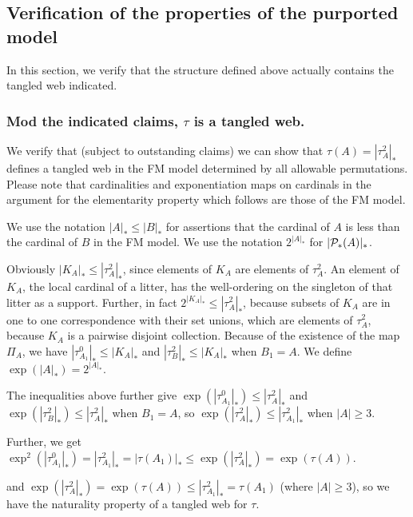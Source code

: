 \documentclass[12pt]{article}
\begin{document}
\newpage

\subsection{Verification of the properties of the purported model}

In this section, we verify that the structure defined above actually contains the tangled web indicated.

\newpage

\subsubsection{Mod the indicated claims, $\tau$ is a tangled web.}

We verify that (subject to outstanding claims) we can show that $\tau(A) = |\tau^2_A|_*$ defines a tangled web in the FM model determined by all allowable permutations.  Please note that cardinalities and exponentiation maps on cardinals in the argument for the elementarity property which  follows are those of the FM model.

We use the notation $|A|_* \leq |B|_*$ for assertions that the cardinal of $A$ is less than the cardinal of $B$ in the FM model.  We use the notation $2^{|A|_*}$ for $|{\cal P}_*(A)|_*$.

Obviously $|K_A|_* \leq |\tau^2_A|_*$, since elements of $K_A$ are elements of $\tau^2_A$.  An element of $K_A$, the local cardinal of a litter, has the well-ordering on the singleton of that litter
as a support.  Further, in fact $2^{|K_A|_*} \leq |\tau^2_A|_*$, because subsets of $K_A$ are in one to one correspondence with their set unions, which are elements of
$\tau^2_A$, because $K_A$ is a pairwise disjoint collection.  Because of the existence of the map $\Pi_A$, we have $|\tau^0_{A_1}|_* \leq |K_A|_*$ and
$|\tau^2_B|_* \leq |K_A|_*$ when $B_1=A$.  We define $\exp(|A|_*) = 2^{|A|_*}$.

The inequalities above further give $\exp(|\tau^0_{A_1}|_*) \leq |\tau^2_A|_*$ and $\exp(|\tau^2_B|_*) \leq |\tau^2_A|_*$ when $B_1=A$, so $\exp(|\tau^2_{A}|_*) \leq |\tau^2_{A_1}|_*$ when $|A|\geq 3$.

Further, we get $\exp^2(|\tau^0_{A_1}|_*) = |\tau^2_{A_1}|_* = |\tau(A_1)|_* \leq \exp(|\tau^2_A|_*) = \exp(\tau(A))$.

and $\exp(|\tau^2_{A}|_*) = \exp(\tau(A)) \leq |\tau^2_{A_1}|_* = \tau(A_1)$ (where $|A| \geq 3$), so we have the naturality property of a tangled web for $\tau$.
\end{document}
